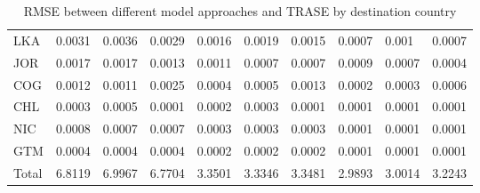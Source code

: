 \begin{table}[ht]
\begin{tabular}{llllllllll}
  LKA & 0.0031 & 0.0036 & 0.0029 & 0.0016 & 0.0019 & 0.0015 & 0.0007 & 0.001 & 0.0007 \\ 
  JOR & 0.0017 & 0.0017 & 0.0013 & 0.0011 & 0.0007 & 0.0007 & 0.0009 & 0.0007 & 0.0004 \\ 
  COG & 0.0012 & 0.0011 & 0.0025 & 0.0004 & 0.0005 & 0.0013 & 0.0002 & 0.0003 & 0.0006 \\ 
  CHL & 0.0003 & 0.0005 & 0.0001 & 0.0002 & 0.0003 & 0.0001 & 0.0001 & 0.0001 & 0.0001 \\ 
  NIC & 0.0008 & 0.0007 & 0.0007 & 0.0003 & 0.0003 & 0.0003 & 0.0001 & 0.0001 & 0.0001 \\ 
  GTM & 0.0004 & 0.0004 & 0.0004 & 0.0002 & 0.0002 & 0.0002 & 0.0001 & 0.0001 & 0.0001 \\ 
  Total & 6.8119 & 6.9967 & 6.7704 & 3.3501 & 3.3346 & 3.3481 & 2.9893 & 3.0014 & 3.2243 \\ 
   \hline
\end{tabular}
\caption{RMSE between different model approaches and TRASE by destination country} 
\end{table}
